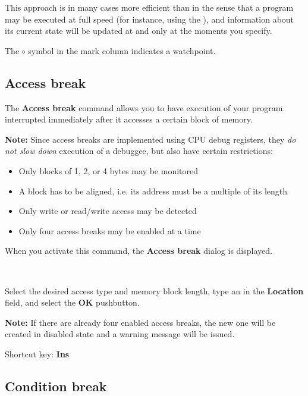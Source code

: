 This approach is in many cases more efficient than
in the sense that a program may be executed at full speed (for instance,
using the ),
and information about its current state will be updated at and
only at the moments you specify.

The $\circ$ symbol in the mark column indicates a watchpoint.

\subsection{Access break}
\label{dialog:breaks:access}

The {\bf Access break} command allows you to have execution of your program
interrupted immediately after it accesses a certain block of memory.

{\bf Note:} Since access breaks are implemented using CPU debug registers,
they {\it do not slow down} execution of a debuggee, but also
have certain restrictions:
\begin{itemize}
\item Only blocks of 1, 2, or 4 bytes may be monitored
\item A block has to be aligned, i.e. its address must be a multiple of its length
\item Only write or read/write access may be detected
\item Only four access breaks may be enabled at a time
\end{itemize}

When you activate this command, the {\bf Access break}
dialog is displayed.
\ifcomment
\begin{figure}[h]
\begin{center} \ \ \end{center}
\end{figure}
\fi
Select the desired access type and memory block length,         %
type an  in the {\bf Location} field,
and select the {\bf OK} pushbutton.

{\bf Note:} If there are already four enabled access breaks, the
new one will be created in disabled state and a warning message will be issued.

Shortcut key: {\bf Ins}

\subsection{Condition break}
\label{dialog:breaks:condition}

